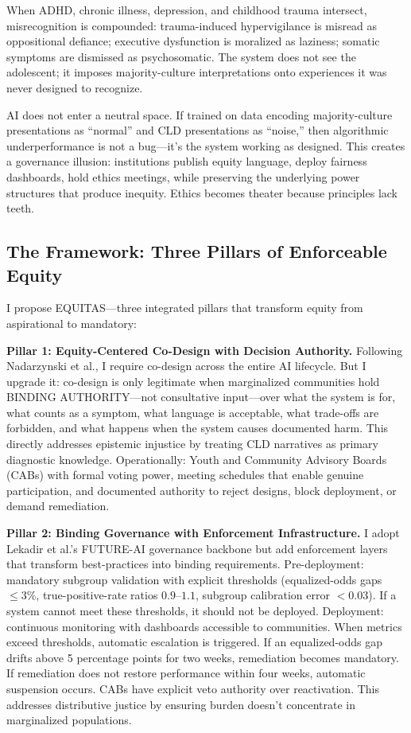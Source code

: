 \documentclass[12pt,a4paper]{article}
\begin{document}
When ADHD, chronic illness, depression, and childhood trauma intersect, misrecognition is compounded: trauma-induced hypervigilance is misread as oppositional defiance; executive dysfunction is moralized as laziness; somatic symptoms are dismissed as psychosomatic. The system does not see the adolescent; it imposes majority-culture interpretations onto experiences it was never designed to recognize.

AI does not enter a neutral space. If trained on data encoding majority-culture presentations as ``normal'' and CLD presentations as ``noise,'' then algorithmic underperformance is not a bug—it's the system working as designed. This creates a governance illusion: institutions publish equity language, deploy fairness dashboards, hold ethics meetings, while preserving the underlying power structures that produce inequity. Ethics becomes theater because principles lack teeth.

\subsection{The Framework: Three Pillars of Enforceable Equity}

I propose EQUITAS—three integrated pillars that transform equity from aspirational to mandatory:

\textbf{Pillar 1: Equity-Centered Co-Design with Decision Authority.} Following Nadarzynski et al., I require co-design across the entire AI lifecycle.\cite{nadarzynski2024} But I upgrade it: co-design is only legitimate when marginalized communities hold BINDING AUTHORITY—not consultative input—over what the system is for, what counts as a symptom, what language is acceptable, what trade-offs are forbidden, and what happens when the system causes documented harm. This directly addresses epistemic injustice by treating CLD narratives as primary diagnostic knowledge. Operationally: Youth and Community Advisory Boards (CABs) with formal voting power, meeting schedules that enable genuine participation, and documented authority to reject designs, block deployment, or demand remediation.

\textbf{Pillar 2: Binding Governance with Enforcement Infrastructure.} I adopt Lekadir et al.'s FUTURE-AI governance backbone but add enforcement layers that transform best-practices into binding requirements.\cite{lekadir2025} Pre-deployment: mandatory subgroup validation with explicit thresholds (equalized-odds gaps $\leq 3\%$, true-positive-rate ratios $0.9$--$1.1$, subgroup calibration error $< 0.03$).\cite{chen2023} If a system cannot meet these thresholds, it should not be deployed. Deployment: continuous monitoring with dashboards accessible to communities. When metrics exceed thresholds, automatic escalation is triggered. If an equalized-odds gap drifts above 5 percentage points for two weeks, remediation becomes mandatory. If remediation does not restore performance within four weeks, automatic suspension occurs. CABs have explicit veto authority over reactivation. This addresses distributive justice by ensuring burden doesn't concentrate in marginalized populations.
\end{document}
